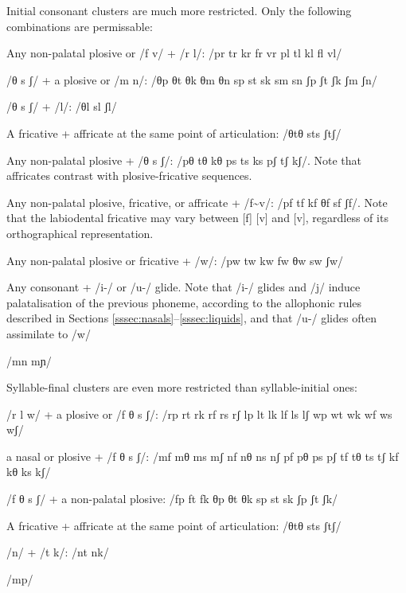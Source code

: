 \documentclass[grammar]{subfiles}
\begin{document}

  Initial consonant clusters are much more restricted.  Only the following combinations are permissable:

  \begin{itemize*}
    \item Any non-palatal plosive or /f v/ + /r l/: /pr tr kr fr vr pl tl kl fl vl/ 
    \item /θ s ʃ/ + a plosive or /m n/: /θp θt θk θm θn sp st sk sm sn ʃp ʃt ʃk ʃm ʃn/
    \item /θ s ʃ/ + /l/: /θl sl ʃl/
    \item A fricative + affricate at the same point of articulation: /θtθ sts ʃtʃ/
    \item Any non-palatal plosive + /θ s ʃ/: /pθ tθ kθ ps ts ks pʃ tʃ kʃ/.  Note that affricates contrast with plosive-fricative sequences.
    \item Any non-palatal plosive, fricative, or affricate + /f\textasciitilde v/: /pf tf kf θf sf ʃf/.  Note that the labiodental fricative may vary between [f] [v] and [v], regardless of its orthographical representation.
    \item Any non-palatal plosive or fricative + /w/: /pw tw kw fw θw sw ʃw/
    \item Any consonant + /i-/ or /u-/ glide.  Note that /i-/ glides and /j/ induce palatalisation of the previous phoneme, according to the allophonic rules described in Sections \ref{sssec:nasals}–\ref{sssec:liquids}, and that /u-/ glides often assimilate to /w/
    \item /mn mɲ/
  \end{itemize*}

  Syllable-final clusters are even more restricted than syllable-initial ones:

  \begin{itemize*}
    \item /r l w/ + a plosive or /f θ s ʃ/: /rp rt rk rf rs rʃ lp lt lk lf ls lʃ wp wt wk wf ws wʃ/
    \item a nasal or plosive + /f θ s ʃ/: /mf mθ ms mʃ nf nθ ns nʃ pf pθ ps pʃ tf tθ ts tʃ kf kθ ks kʃ/
    \item /f θ s ʃ/ + a non-palatal plosive: /fp ft fk θp θt θk sp st sk ʃp ʃt ʃk/
    \item A fricative + affricate at the same point of articulation: /θtθ sts ʃtʃ/
    \item /n/ + /t k/: /nt nk/
    \item /mp/
  \end{itemize*}
\end{document}
